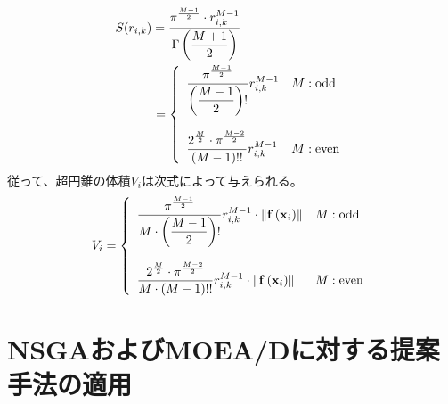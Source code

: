 \documentclass{rentai-chugoku}
\begin{document}
\begin{eqnarray}
S(r_{i,k}) 
= \frac{ \displaystyle\pi^\frac{M-1}{2}\cdot r_{i,k}^{M-1} }{ \displaystyle\Gamma\left( \frac{M+1}{2} \right) }
\hspace{30mm}\\
= \left\{
\begin{array}{ll}
\displaystyle\frac{ \displaystyle\pi^{\frac{M-1}{2}} }{ \displaystyle\left( \frac{M-1}{2} \right)! } r_{i,k}^{M-1} & M:{\rm odd}\\
\\
\displaystyle\frac{\displaystyle2^{\frac{M}{2}}\cdot \displaystyle\pi^{\frac{M-2}{2}}}{\left( M-1 \right)!!} r_{i,k}^{M-1} & M:{\rm even}
\end{array}
\right.
\end{eqnarray}
従って、超円錐の体積$V_i$は次式によって与えられる。
\begin{equation}
V_i = 
\left\{
\begin{array}{ll}
\displaystyle\frac{ \displaystyle\pi^{\frac{M-1}{2}} }{ M\cdot\displaystyle\left( \frac{M-1}{2} \right)! } r_{i,k}^{M-1} \cdot\left\| {\bf f}\left( {\bf x}_i \right) \right\| & M:{\rm odd}\\
\\
\displaystyle\frac{\displaystyle2^{\frac{M}{2}}\cdot \displaystyle\pi^{\frac{M-2}{2}}}{M\cdot\left( M-1 \right)!!} r_{i,k}^{M-1} \cdot\left\| {\bf f}\left( {\bf x}_i \right) \right\| & M:{\rm even}
\end{array}
\right.
\end{equation}


\section{NSGAおよびMOEA/Dに対する提案手法の適用}
\end{document}
